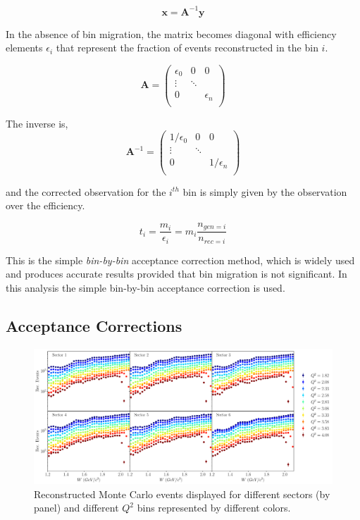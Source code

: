 \begin{equation}
  \mathbf{x} = \mathbf{A}^{-1} \mathbf{y} 
\end{equation}

In the absence of bin migration, the matrix becomes diagonal with efficiency elements $\epsilon_i$ that represent the fraction of events reconstructed in the bin $i$.

\begin{equation}
  \mathbf{A} = \begin{pmatrix}
    \epsilon_0 & 0 & 0\\
    \vdots & \ddots \\
    0 &  & \epsilon_n \\
  \end{pmatrix}
\end{equation}


The inverse is, 
\begin{equation}
  \mathbf{A}^{-1} = \begin{pmatrix}
    1/\epsilon_0 & 0 & 0\\
    \vdots & \ddots \\
    0 &  & 1/\epsilon_n \\
  \end{pmatrix}
\end{equation}

and the corrected observation for the $i^{th}$ bin is simply given by the observation over the efficiency.

\begin{equation}
  t_i = \frac{m_i}{\epsilon_i} = m_i \frac{n_{gen=i}}{n_{rec=i}}
\end{equation}

This is the simple \textit{bin-by-bin} acceptance correction method, which is widely used and produces accurate results provided that bin migration is not significant.  In this analysis the simple bin-by-bin acceptance correction is used.  

\subsection{Acceptance Corrections}
\begin{figure}
	\centering
	\label{fig-rec-events} 
	\includegraphics[width=\textwidth]{image/plots/inclusive/rec_events_superimposed.pdf}
	\caption{Reconstructed Monte Carlo events displayed for different sectors (by panel) and different $Q^2$ bins represented by different colors.}
\end{figure}

